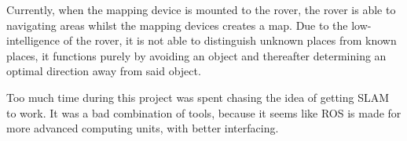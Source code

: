 

Currently, when the mapping device is mounted to the rover, the rover is able to navigating areas whilst the mapping devices creates a map. Due to the low-intelligence of the rover, it is not able to distinguish unknown places from known places, it functions purely by avoiding an object and thereafter determining an optimal direction away from said object.


Too much time during this project was spent chasing the idea of getting SLAM to work. It was a bad combination of tools, because it seems like ROS is made for more advanced computing units, with better interfacing. 
